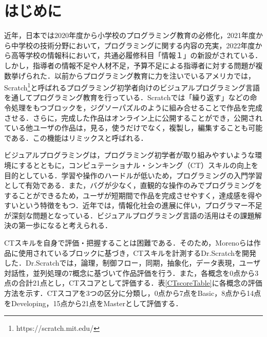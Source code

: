 \documentclass[submit,techrep,noauthor]{ipsj}
\begin{document}
\maketitle

\section{はじめに}

近年，日本では2020年度から小学校のプログラミング教育の必修化，2021年度から中学校の技術分野において，プログラミングに関する内容の充実，2022年度から高等学校の情報科において，共通必履修科目「情報１」の新設がされている\cite{monkashou}．しかし，指導者の情報不足や人材不足，予算不足による指導者に対する問題が複数挙げられた\cite{monkashou2}．以前からプログラミング教育に力を注いでいるアメリカでは，Scratch\footnote{https://scratch.mit.edu/}\cite{resnick2009scratch}と呼ばれるプログラミング初学者向けのビジュアルプログラミング言語を通してプログラミング教育を行っている．Scratchでは「繰り返す」などの命令処理をもつブロックを，ジグソーパズルのように組み合せることで作品を完成させる．さらに，完成した作品はオンライン上に公開することができ，公開されている他ユーザの作品は，見る，使うだけでなく，複製し，編集することも可能である．この機能はリミックスと呼ばれる．

ビジュアルプログラミングは，プログラミング初学者が取り組みやすいような環境にするとともに，コンピュテーショナル・シンキング（CT）\cite{wing2006computational}スキルの向上を目的としている．学習や操作のハードルが低いため，プログラミングの入門学習として有効である．また，バグが少なく，直観的な操作のみでプログラミングをすることができるため，ユーザが短期間で作品を完成させやすく，達成感を得やすいという特徴をもつ．近年では，情報化社会の進展に伴い，プログラマー不足が深刻な問題となっている．ビジュアルプログラミング言語の活用はその課題解決の第一歩になると考えられる．

CTスキルを自身で評価・把握することは困難である．そのため，Morenoらは作品に使用されているブロックに基づき，CTスキルを計測するDr.Scratch\cite{moreno2015dr}を開発した．Dr.Scratchでは，論理，制御フロー，同期，抽象化，データ表現，ユーザ対話性，並列処理の7概念に基づいて作品評価を行う．また，各概念を0点から3点の合計21点とし，CTスコアとして評価する．表\ref{CTscoreTable}に各概念の評価方法を示す．CTスコアを3つの区分に分類し，0点から7点をBasic，8点から14点をDeveloping，15点から21点をMasterとして評価する．
\end{document}
